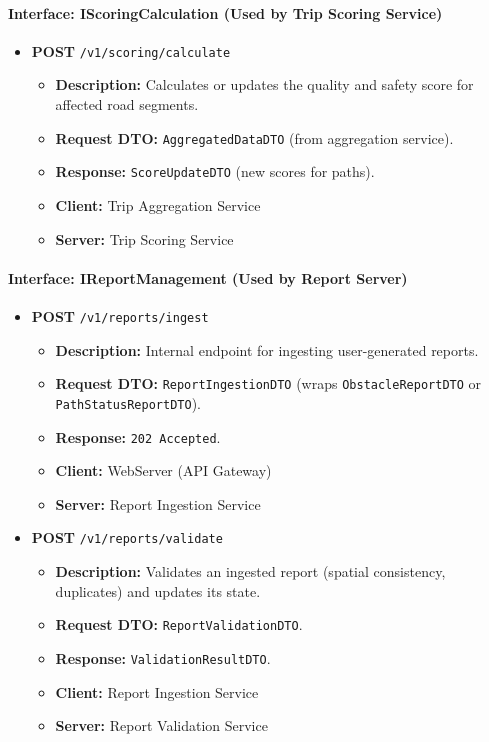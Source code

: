 \paragraph{Interface: IScoringCalculation (Used by Trip Scoring Service)}
\begin{itemize}
    \item \textbf{POST} \texttt{/v1/scoring/calculate}
    \begin{itemize}
        \item \textbf{Description:} Calculates or updates the quality and safety score for affected road segments.
        \item \textbf{Request DTO:} \texttt{AggregatedDataDTO} (from aggregation service).
        \item \textbf{Response:} \texttt{ScoreUpdateDTO} (new scores for paths).
        \item \textbf{Client:} Trip Aggregation Service
        \item \textbf{Server:} Trip Scoring Service
    \end{itemize}
\end{itemize}

\paragraph{Interface: IReportManagement (Used by Report Server)}
\begin{itemize}
    \item \textbf{POST} \texttt{/v1/reports/ingest}
    \begin{itemize}
        \item \textbf{Description:} Internal endpoint for ingesting user-generated reports.
        \item \textbf{Request DTO:} \texttt{ReportIngestionDTO} (wraps \texttt{ObstacleReportDTO} or \texttt{PathStatusReportDTO}).
        \item \textbf{Response:} \texttt{202 Accepted}.
        \item \textbf{Client:} WebServer (API Gateway)
        \item \textbf{Server:} Report Ingestion Service
    \end{itemize}
    
    \item \textbf{POST} \texttt{/v1/reports/validate}
    \begin{itemize}
        \item \textbf{Description:} Validates an ingested report (spatial consistency, duplicates) and updates its state.
        \item \textbf{Request DTO:} \texttt{ReportValidationDTO}.
        \item \textbf{Response:} \texttt{ValidationResultDTO}.
        \item \textbf{Client:} Report Ingestion Service
        \item \textbf{Server:} Report Validation Service
    \end{itemize}
\end{itemize}

